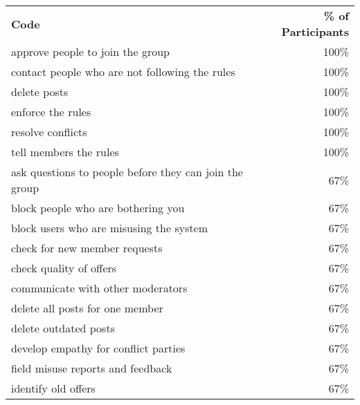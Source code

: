 \begin{longtable}{p{}r}
\textbf{Code}                                                       & \textbf{\% of Participants} \\
approve people to join the group                                    & 100\%                       \\
contact people who are not following the rules                      & 100\%                       \\
delete posts                                                        & 100\%                       \\
enforce the rules                                                   & 100\%                       \\
resolve conflicts                                                   & 100\%                       \\
tell members the rules                                              & 100\%                       \\
ask questions to people before they can join the group              & 67\%                        \\
block people who are bothering you                                  & 67\%                        \\
block users who are misusing the system                             & 67\%                        \\
check for new member requests                                       & 67\%                        \\
check quality of offers                                             & 67\%                        \\
communicate with other moderators                                   & 67\%                        \\
delete all posts for one member                                     & 67\%                        \\
delete outdated posts                                               & 67\%                        \\
develop empathy for conflict parties                                & 67\%                        \\
field misuse reports and feedback                                   & 67\%                        \\
identify old offers                                                 & 67\%                        \\

\end{longtable}
